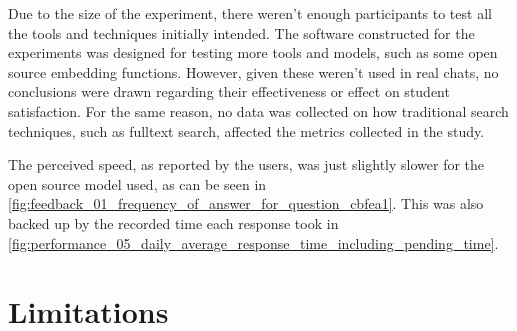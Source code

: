 

Due to the size of the experiment, there weren't enough participants to test all the tools and techniques initially intended. The software constructed for the experiments was designed for testing more tools and models, such as some open source embedding functions. However, given these weren’t used in real chats, no conclusions were drawn regarding their effectiveness or effect on student satisfaction. For the same reason, no data was collected on how traditional search techniques, such as fulltext search, affected the metrics collected in the study.




The perceived speed, as reported by the users, was just slightly slower for the open source model used, as can be seen in \autoref{fig:feedback_01_frequency_of_answer_for_question_cbfea1}. This was also backed up by the recorded time each response took in \autoref{fig:performance_05_daily_average_response_time_including_pending_time}.


















\section{Limitations}
\label{sec:limitations}


